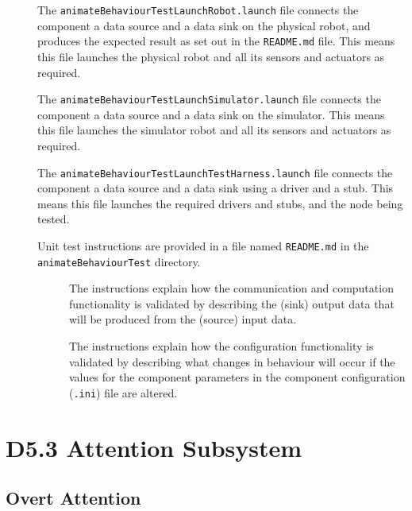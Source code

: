 \documentclass{CSSRforAfrica}
\newcommand{\checkboxChecked}{\fbox{\ding{51}}} %
\newcommand{\checkboxDashed}{\fbox{--}}         %
\begin{document}
\begin{description}
\item[\checkboxChecked] The {\small \verb+animateBehaviourTestLaunchRobot.launch+} file  connects the component a data source and a data sink on the physical robot, and produces the expected result as set out in the  {\small \verb+README.md+}  file.    This means this file launches the physical robot and all its sensors and actuators as required.

\item[\checkboxDashed] The {\small \verb+animateBehaviourTestLaunchSimulator.launch+} file  connects the component a data source and a data sink on the simulator.   This means this file launches the simulator robot and all its sensors and actuators as required.

\item[\checkboxChecked] The {\small \verb+animateBehaviourTestLaunchTestHarness.launch+} file  connects the component a data source and a data sink using a driver and a stub.   This means this file launches the required drivers and stubs, and the node being tested.

\item[\checkboxChecked] Unit test instructions are provided in a file named {\small \verb+README.md+} in the  {\small \verb+animateBehaviourTest+} directory. 


\begin{description}

\item[\checkboxChecked] The instructions explain how the communication and computation functionality is validated by describing the (sink) output data that will be produced from the (source) input data.  

\item[\checkboxChecked] The instructions explain how the configuration functionality is validated by describing what changes in behaviour will occur if the values for the component parameters in the component configuration ({\small \verb+.ini+}) file are altered.

\end{description}
\end{description} 
\newpage
  


\section{D5.3 Attention Subsystem} 
\subsection{Overt Attention} 
\label{subsection:overt_attention}
\end{document}
